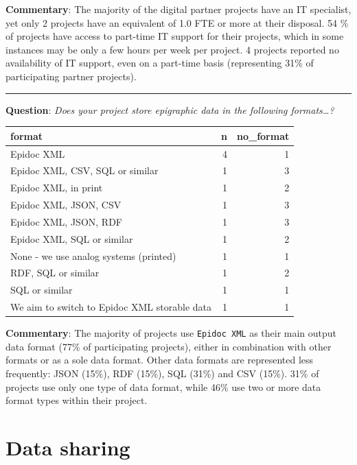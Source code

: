 \documentclass[
  12pt,
]{scrreprt}
\begin{document}
\normalsize

\textbf{Commentary}: The majority of the digital partner projects have
an IT specialist, yet only 2 projects have an equivalent of 1.0 FTE or
more at their disposal. 54 \% of projects have access to part-time IT
support for their projects, which in some instances may be only a few
hours per week per project. 4 projects reported no availability of IT
support, even on a part-time basis (representing 31\% of participating
partner projects).

\begin{center}\rule{0.5\linewidth}{0.5pt}\end{center}

\textbf{Question}: \emph{Does your project store epigraphic data in the
following formats\ldots?}

\footnotesize

\begin{longtable}[]{@{}lrr@{}}
\toprule
format & n & no\_format \\
\midrule
\endhead
Epidoc XML & 4 & 1 \\
Epidoc XML, CSV, SQL or similar & 1 & 3 \\
Epidoc XML, in print & 1 & 2 \\
Epidoc XML, JSON, CSV & 1 & 3 \\
Epidoc XML, JSON, RDF & 1 & 3 \\
Epidoc XML, SQL or similar & 1 & 2 \\
None - we use analog systems (printed) & 1 & 1 \\
RDF, SQL or similar & 1 & 2 \\
SQL or similar & 1 & 1 \\
We aim to switch to Epidoc XML storable data & 1 & 1 \\
\bottomrule
\end{longtable}

\normalsize

\footnotesize

\normalsize

\textbf{Commentary}: The majority of projects use \texttt{Epidoc\ XML}
as their main output data format (77\% of participating projects),
either in combination with other formats or as a sole data format. Other
data formats are represented less frequently: JSON (15\%), RDF (15\%),
SQL (31\%) and CSV (15\%). 31\% of projects use only one type of data
format, while 46\% use two or more data format types within their
project.

\hypertarget{data-sharing}{%
\section{Data sharing}\label{data-sharing}}
\end{document}
